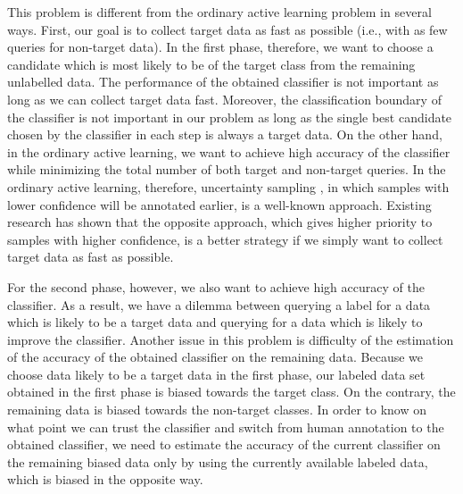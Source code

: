 \documentclass{deime}
\begin{document}
This problem is different from the ordinary active learning problem in
several ways.  First, our goal is to collect target data as fast as
possible (i.e., with as few queries for non-target data).  In the
first phase, therefore, we want to choose a candidate which is most
likely to be of the target class from the remaining unlabelled data.
The performance of the obtained classifier is not important as long as
we can collect target data fast.  Moreover, the classification
boundary of the classifier is not important in our problem as long as
the single best candidate chosen by the classifier in each step is
always a target data.  On the other hand, in the ordinary active
learning, we want to achieve high accuracy of the classifier while
minimizing the total number of both target and non-target queries.  In
the ordinary active learning, therefore, uncertainty sampling
\cite{uncertainty}, in which samples with lower confidence will be
annotated earlier, is a well-known approach.  Existing research has
shown that the opposite approach, which gives higher priority to
samples with higher confidence, is a better strategy \cite{enumerate}
if we simply want to collect target data as fast as possible.

For the second phase, however, we also want to achieve high accuracy
of the classifier.  As a result, we have a dilemma between querying a
label for a data which is likely to be a target data and querying for
a data which is likely to improve the classifier.  Another issue in
this problem is difficulty of the estimation of the accuracy of the
obtained classifier on the remaining data.  Because we choose data
likely to be a target data in the first phase, our labeled data set
obtained in the first phase is biased towards the target class.  On
the contrary, the remaining data is biased towards the non-target
classes.  In order to know on what point we can trust the classifier
and switch from human annotation to the obtained classifier, we need
to estimate the accuracy of the current classifier on the remaining
biased data only by using the currently available labeled data, which
is biased in the opposite way.
\end{document}
